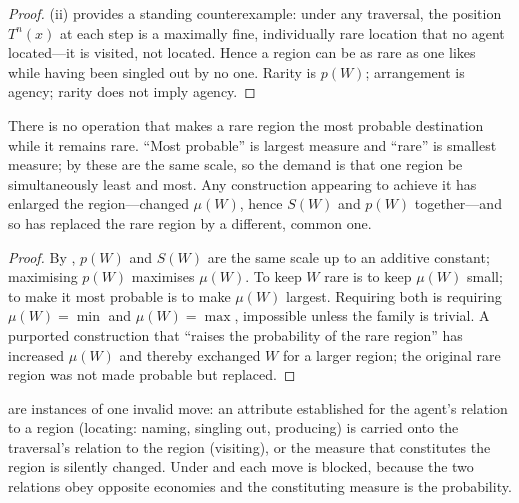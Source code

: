 \begin{proof}
(ii) provides a standing counterexample: under any traversal,
the position $T^{n}(x)$ at each step is a maximally fine, individually rare
location that no agent located---it is visited, not located. Hence a region can be
as rare as one likes while having been singled out by no one. Rarity is $p(W)$;
arrangement is agency; rarity does not imply agency.
\end{proof}

\begin{proposition}
\label{prop:cannot-raise}
There is no operation that makes a rare region the most probable destination while
it remains rare. ``Most probable'' is largest measure and ``rare'' is smallest
measure; by  these are the same scale, so the demand is that
one region be simultaneously least and most. Any construction appearing to achieve
it has enlarged the region---changed $\mu(W)$, hence $S(W)$ and $p(W)$ together---and
so has replaced the rare region by a different, common one.
\end{proposition}

\begin{proof}
By , $p(W)$ and $S(W)$ are the same scale up to an additive
constant; maximising $p(W)$ maximises $\mu(W)$. To keep $W$ rare is to keep
$\mu(W)$ small; to make it most probable is to make $\mu(W)$ largest. Requiring
both is requiring $\mu(W)=\min$ and $\mu(W)=\max$, impossible unless the family is
trivial. A purported construction that ``raises the probability of the rare
region'' has increased $\mu(W)$ and thereby exchanged $W$ for a larger region; the
original rare region was not made probable but replaced.
\end{proof}

\begin{proposition}
\label{prop:one-form}
 are instances of one invalid
move: an attribute established for the agent's relation to a region
\textup{(}locating: naming, singling out, producing\textup{)} is carried onto the
traversal's relation to the region \textup{(}visiting\textup{)}, or the measure
that constitutes the region is silently changed. Under  and
 each move is blocked, because the two relations obey
opposite economies and the constituting measure is the probability.
\end{proposition}

